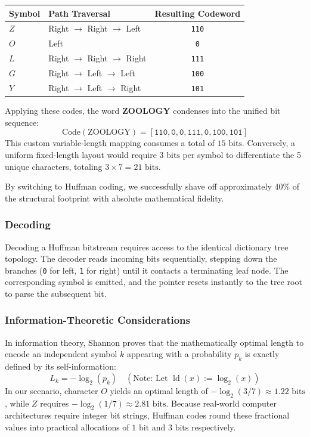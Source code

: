 \documentclass{article}
\begin{document}
\begin{center}
\begin{tabular}{llc}
  \hline
  \textbf{Symbol} & \textbf{Path Traversal} & \textbf{Resulting Codeword} \\ \hline
  $Z$ & Right $\to$ Right $\to$ Left   & \texttt{110} \\
  $O$ & Left                          & \texttt{0}   \\
  $L$ & Right $\to$ Right $\to$ Right  & \texttt{111} \\
  $G$ & Right $\to$ Left $\to$ Left    & \texttt{100} \\
  $Y$ & Right $\to$ Left $\to$ Right   & \texttt{101} \\ \hline
\end{tabular}
\end{center}

Applying these codes, the word \textbf{ZOOLOGY} condenses into the unified bit sequence:
\[
\text{Code}(\text{ZOOLOGY}) = [\texttt{110}, \texttt{0}, \texttt{0}, \texttt{111}, \texttt{0}, \texttt{100}, \texttt{101}]
\]
This custom variable-length mapping consumes a total of $15\text{ bits}$. Conversely, a uniform fixed-length layout would require $3\text{ bits}$ per symbol to differentiate the 5 unique characters, totaling $3 \times 7 = 21\text{ bits}$. 

By switching to Huffman coding, we successfully shave off approximately $40\%$ of the structural footprint with absolute mathematical fidelity.

\subsubsection{Decoding}
Decoding a Huffman bitstream requires access to the identical dictionary tree topology. The decoder reads incoming bits sequentially, stepping down the branches (\texttt{0} for left, \texttt{1} for right) until it contacts a terminating leaf node. The corresponding symbol is emitted, and the pointer resets instantly to the tree root to parse the subsequent bit.

\subsubsection{Information-Theoretic Considerations}
In information theory, Shannon proves that the mathematically optimal length to encode an independent symbol $k$ appearing with a probability $p_k$ is exactly defined by its self-information:
\[
L_k = -\log_2(p_k) \quad (\text{Note: Let } \operatorname{ld}(x) := \log_2(x))
\]
In our scenario, character $O$ yields an optimal length of $-\log_2(3/7) \approx 1.22\text{ bits}$, while $Z$ requires $-\log_2(1/7) \approx 2.81\text{ bits}$. Because real-world computer architectures require integer bit strings, Huffman codes round these fractional values into practical allocations of $1\text{ bit}$ and $3\text{ bits}$ respectively.
\end{document}

